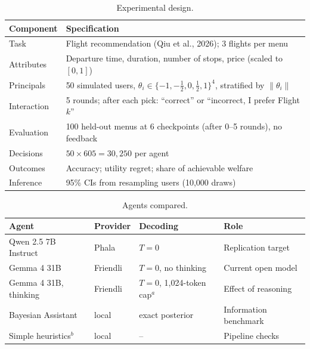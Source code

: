 
\begin{table}[t]
\centering
\caption{Experimental design.}
\label{tab:design}
\begin{tabular}{@{}ll@{}}
\toprule
Component & Specification \\
\midrule
Task & Flight recommendation (Qiu et al., 2026); 3 flights per menu \\
Attributes & Departure time, duration, number of stops, price (scaled to $[0,1]$) \\
Principals & 50 simulated users, $\theta_i \in \{-1,-\tfrac12,0,\tfrac12,1\}^4$, stratified by $\lVert\theta_i\rVert$ \\
Interaction & 5 rounds; after each pick: ``correct'' or ``incorrect, I prefer Flight $k$'' \\
Evaluation & 100 held-out menus at 6 checkpoints (after 0--5 rounds), no feedback \\
Decisions & $50 \times 605 = 30{,}250$ per agent \\
Outcomes & Accuracy; utility regret; share of achievable welfare \\
Inference & 95\% CIs from resampling users (10{,}000 draws) \\
\bottomrule
\end{tabular}
\end{table}

\begin{table}[t]
\centering
\caption{Agents compared.}
\label{tab:agents}
\small
\begin{tabular}{@{}llll@{}}
\toprule
Agent & Provider & Decoding & Role \\
\midrule
Qwen 2.5 7B Instruct & Phala & $T=0$ & Replication target \\
Gemma 4 31B & Friendli & $T=0$, no thinking & Current open model \\
Gemma 4 31B, thinking & Friendli & $T=0$, 1{,}024-token cap$^{a}$ & Effect of reasoning \\
Bayesian Assistant & local & exact posterior & Information benchmark \\
Simple heuristics$^{b}$ & local & -- & Pipeline checks \\
\bottomrule
\end{tabular}
\par{}
\end{table}

